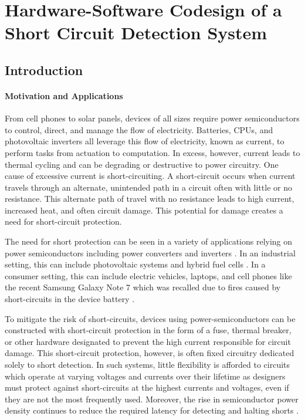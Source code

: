 \section{Hardware-Software Codesign of a Short Circuit Detection System}   \label{chap:scd}

\subsection{Introduction}   \label{subsec:hardwareSoftwarreCodesign}

\paragraph{Motivation and Applications}
From cell phones to solar panels, devices of all sizes require power semiconductors to control, direct, and manage the flow of electricity.
Batteries, CPUs, and photovoltaic inverters all leverage this flow of electricity, known as current, to perform tasks from actuation to computation.
In excess, however, current leads to thermal cycling and can be degrading or destructive to power circuitry.
One cause of excessive current is short-circuiting.
A short-circuit occurs when current travels through an alternate, unintended path in a circuit often with little or no resistance.
This alternate path of travel with no resistance leads to high current, increased heat, and often circuit damage.
This potential for damage creates a need for short-circuit protection.

The need for short protection can be seen in a variety of applications relying on power semiconductors including power converters and inverters \cite{hiSpeedProtection}.
In an industrial setting, this can include photovoltaic systems and hybrid fuel cells \cite{photoVoltaic}. 
In a consumer setting, this can include electric vehicles, laptops, and cell phones like the recent Samsung Galaxy Note 7 which was recalled due to fires caused by short-circuits in the device battery \cite{explodingPhone}.

To mitigate the risk of short-circuits, devices using power-semiconductors can be constructed with short-circuit protection in the form of a fuse, thermal breaker, or other hardware designated to prevent the high current responsible for circuit damage. 
This short-circuit protection, however, is often fixed circuitry dedicated solely to short detection. In such systems, little flexibility is afforded to circuits which operate at varying voltages and currents over their lifetime as designers must protect against short-circuits at the highest currents and voltages, even if they are not the most frequently used. Moreover, the rise in semiconductor power density continues to reduce the required latency for detecting and halting shorts \cite{gateChargeChara}.

